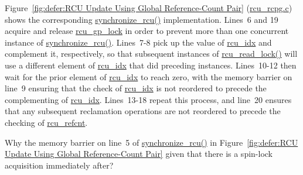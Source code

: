 Figure~\ref{fig:defer:RCU Update Using Global Reference-Count Pair}
(\url{rcu_rcpg.c})
shows the corresponding \url{synchronize_rcu()} implementation.
Lines~6 and 19 acquire and release \url{rcu_gp_lock} in order to
prevent more than one concurrent instance of \url{synchronize_rcu()}.
Lines~7-8 pick up the value of \url{rcu_idx} and complement it,
respectively, so that subsequent instances of \url{rcu_read_lock()}
will use a different element of \url{rcu_idx} that did preceding
instances.
Lines~10-12 then wait for the prior element of \url{rcu_idx} to
reach zero, with the memory barrier on line~9 ensuring that the check
of \url{rcu_idx} is not reordered to precede the complementing of
\url{rcu_idx}.
Lines~13-18 repeat this process, and line~20 ensures that any
subsequent reclamation operations are not reordered to precede the
checking of \url{rcu_refcnt}.

\QuickQuiz{}
	Why the memory barrier on line~5 of \url{synchronize_rcu()} in
	Figure~\ref{fig:defer:RCU Update Using Global Reference-Count Pair}
	given that there is a spin-lock acquisition immediately after?
 \QuickQuizEnd


